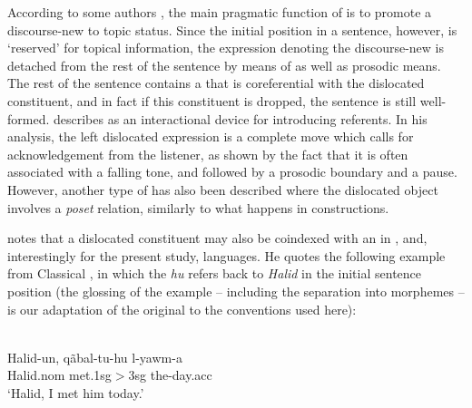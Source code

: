 \documentclass[output=paper]{LSP/langsci}
\begin{document}
According to some authors \citep{Lambrecht2001, GregoryMichaelis2001},
the main pragmatic function of  is to promote a
discourse-new  to topic status. Since the initial position in
a sentence, however, is `reserved' for topical information, the
expression denoting the discourse-new  is detached from the
rest of the sentence by means of  as well as prosodic
means. The rest of the sentence contains a  that is
coreferential with the dislocated constituent, and in fact if this
constituent is dropped, the sentence is still
well-formed. \citet{geluykens1992} describes  as an
interactional device for introducing referents. In his analysis, the
left dislocated expression is a complete move which calls for
acknowledgement from the listener, as shown by the fact that it is
often associated with a falling tone, and followed by a prosodic
boundary and a pause. However, another type of  has also been
described \citep{Prince1997, geluykens1992, GregoryMichaelis2001}
where the dislocated object involves a {\em poset} relation, similarly
to what happens in  constructions.

\citet{Lambrecht2001} notes that a dislocated constituent may also be
coindexed with an  in ,  and,
interestingly for the present study,  languages. He quotes the
following example from Classical , in which the  
{\em hu} refers back to {\em Halid} in the
initial sentence position 
(the glossing of the example -- including the separation into morphemes -- is our adaptation of the original to the conventions used here):

\ea\label{ex:LD:ara}
\\
\gll Halid-un, q\~{a}bal-tu-hu l-yawm-a\\
     Halid.{\sc nom} met.{\sc 1sg}$>${\sc 3sg} the-day.{\sc acc}\\
\glt `Halid, I met him today.'
\z


\end{document}
